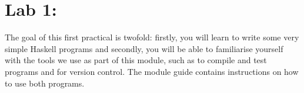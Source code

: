 \section{Lab 1: \practicalOneTitle}


The goal of this first practical is twofold: firstly, you will learn to write some very simple Haskell programs and secondly, you will be able to familiarise yourself with the tools we use as part of this module, such as  to compile and test programs and  for version control. The module guide contains instructions on how to use both programs.

